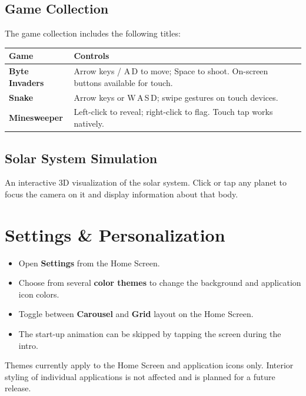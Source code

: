 \documentclass[a4paper,12pt]{article}
\begin{document}
\subsection{Game Collection}
 
The game collection includes the following titles:
 
\begin{center}
\begin{tabular}{>{\bfseries}p{3.5cm} p{8.5cm}}
\toprule
Game & Controls \\
\midrule
Byte Invaders   & Arrow keys / A\,D to move; Space to shoot. On-screen buttons available for touch. \\
Snake           & Arrow keys or W\,A\,S\,D; swipe gestures on touch devices. \\
Minesweeper     & Left-click to reveal; right-click to flag. Touch tap works natively. \\
\bottomrule
\end{tabular}
\end{center}
 
\subsection{Solar System Simulation}
 
An interactive 3D visualization of the solar system. Click or tap any planet to focus the camera on it and display information about that body.
 
\section{Settings \& Personalization}
 
\begin{itemize}[leftmargin=1.5em]
    \item Open \textbf{Settings} from the Home Screen.
    \item Choose from several \textbf{color themes} to change the background and application icon colors.
    \item Toggle between \textbf{Carousel} and \textbf{Grid} layout on the Home Screen.
    \item The start-up animation can be skipped by tapping the screen during the intro.
\end{itemize}
 
\begin{notebox}
Themes currently apply to the Home Screen and application icons only. Interior styling of individual applications is not affected and is planned for a future release.
\end{notebox}
 
\end{document}
